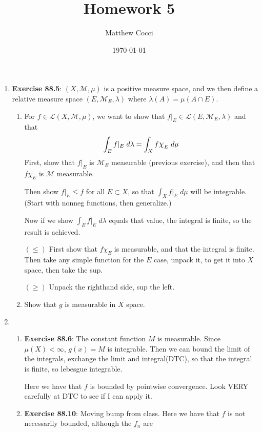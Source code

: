 \documentclass[12pt]{article}
\author{Matthew Cocci}
\title{\textbf{Homework 5}}
\date{\today}
\theoremstyle{plain}
\theoremstyle{definition}
\theoremstyle{remark}
\newcommand*{\Chi}{\mbox{\large$\chi$}} %
\begin{document}
\maketitle 

\begin{enumerate} 

\item \textbf{Exercise 88.5}: $(X,\mathscr{M},\mu)$ is a positive measure space, and we then define a relative measure space $(E,\mathscr{M}_E,\lambda)$ where $\lambda(A)=\mu(A\cap E)$.

\begin{enumerate}
\item For $f\in\mathscr{L}(X,\mathscr{M},\mu)$, we want to show that $f|_E \in\mathscr{L}(E,\mathscr{M}_E,\lambda)$ and that
\[
    \int_E f|_E \; d\lambda = \int_X f \Chi_E\; d\mu
\]
First, show that $f|_E$ is $\mathscr{M}_E$ measurable (previous exercise), and then that $f\chi_E$ is $\mathscr{M}$ measurable.

Then show $f|_E \leq f$ for all $E\subset X$, so that $\int_X f|_E \; d\mu$ will be integrable. (Start with nonneg functions, then generalize.) 

Now if we show $\int_E f|_E \; d\lambda$ equals that value, the integral is finite, so the result is achieved.

$(\leq)$ First show that $f\chi_E$ is measurable, and that the integral is finite. Then take any simple function for the $E$ case, unpack it, to get it into $X$ space, then take the sup.

$(\geq)$ Unpack the righthand side, sup the left.

\item Show that $g$ is measurable in $X$ space.  

\end{enumerate}

\item 

\begin{enumerate} 
        
\item \textbf{Exercise 88.6}: The constant function $M$ is measurable. Since $\mu(X)<\infty$, $g(x)=M$ is integrable. Then we can bound the limit of the integrals, exchange the limit and integral(DTC), so that the integral is finite, so lebesgue integrable.

Here we have that $f$ is bounded by pointwise convergence. Look VERY carefully at DTC to see if I can apply it.

\item \textbf{Exercise 88.10}: Moving bump from class. Here we have that $f$ is not necessarily bounded, although the $f_n$ are
\end{enumerate}


\end{enumerate}
\end{document}
